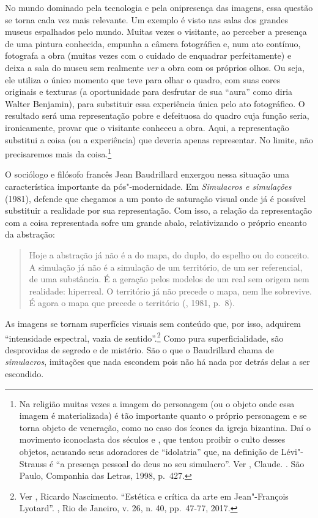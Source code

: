 No mundo dominado pela tecnologia e pela onipresença das imagens, essa
questão se torna cada vez mais relevante. Um exemplo é visto nas salas
dos grandes museus espalhados pelo mundo. Muitas vezes o visitante, ao
perceber a presença de uma pintura conhecida, empunha a câmera
fotográfica e, num ato contínuo, fotografa a obra (muitas vezes com o
cuidado de enquadrar perfeitamente) e deixa a sala do museu sem
realmente \emph{ver} a obra com os próprios olhos. Ou seja, ele utiliza
o único momento que teve para olhar o quadro, com suas cores originais e
texturas (a oportunidade para desfrutar de sua ``aura'' como diria
Walter Benjamin), para substituir essa experiência única pelo ato
fotográfico. O resultado será uma representação pobre e defeituosa do
quadro cuja função seria, ironicamente, provar que o visitante conheceu
a obra. Aqui, a representação substitui a coisa (ou a experiência) que
deveria apenas representar. No limite, não precisaremos mais da
coisa.\footnote{Na religião muitas vezes a imagem do personagem (ou o
  objeto onde essa imagem é materializada) é tão importante quanto o
  próprio personagem e se torna objeto de veneração, como no caso dos
  ícones da igreja bizantina. Daí o movimento iconoclasta dos séculos
   e , que tentou proibir o culto desses objetos, acusando seus
  adoradores de ``idolatria'' que, na definição de Lévi"-Strauss é ``a
  presença pessoal do deus no seu simulacro''. Ver , Claude.
  {}. São Paulo, Companhia das Letras, 1998, p.~427.}

O sociólogo e filósofo francês Jean Baudrillard enxergou nessa situação
uma característica importante da pós"-modernidade. Em \emph{Simulacros e
simulações} (1981), defende que chegamos a um ponto de saturação visual
onde já é possível substituir a realidade por sua representação. Com
isso, a relação da representação com a coisa representada sofre um
grande abalo, relativizando o próprio encanto da abstração:

\begin{quote}
Hoje a abstração já não é a do mapa, do duplo, do espelho ou do
conceito. A simulação já não é a simulação de um território, de um ser
referencial, de uma substância. É a geração pelos modelos de um real sem
origem nem realidade: hiperreal. O território já não precede o mapa,
nem lhe sobrevive. É agora o mapa que precede o território (,
1981, p.~8).
\end{quote}

As imagens se tornam superfícies visuais sem conteúdo que, por isso,
adquirem ``intensidade espectral, vazia de sentido''.\footnote{Ver
  , Ricardo Nascimento. ``Estética e crítica da arte em
  Jean"-François Lyotard''. {}, Rio de Janeiro, v. 26, n. 40, pp.~47-77, 2017.}
Como pura superficialidade, são desprovidas de segredo e de mistério.
São o que o Baudrillard chama de \emph{simulacros}, imitações que nada
escondem pois não há nada por detrás delas a ser escondido.

